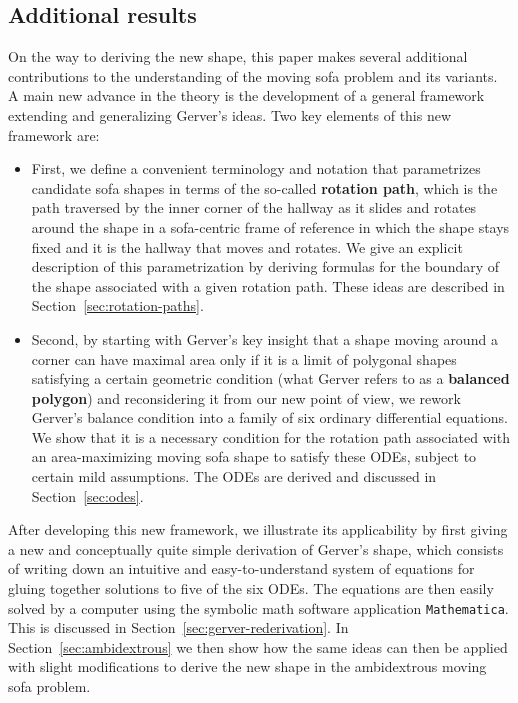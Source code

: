 \documentclass[11pt]{article}
\begin{document}
\subsection{Additional results}

On the way to deriving the new shape, this paper makes several additional contributions to the understanding of the moving sofa problem and its variants. A main new advance in the theory is the development of a general framework extending and generalizing Gerver's ideas. Two key elements of this new framework are: 

\begin{itemize}
\item First, we define a convenient terminology and notation that parametrizes candidate sofa shapes in terms of the so-called \textbf{rotation path}, which is the path traversed by the inner corner of the hallway as it slides and rotates around the shape in a sofa-centric frame of reference in which the shape stays fixed and it is the hallway that moves and rotates. We give an explicit description of this parametrization by deriving formulas for the boundary of the shape associated with a given rotation path. These ideas are described in Section~\ref{sec:rotation-paths}.

\item Second, by starting with Gerver's key insight that a shape moving around a corner can have maximal area only if it is a limit of polygonal shapes satisfying a certain geometric condition (what Gerver refers to as a \textbf{balanced polygon}) and reconsidering it from our new point of view, we rework Gerver's balance condition into a family of six ordinary differential equations. We show that it is a necessary condition for the rotation path associated with an area-maximizing moving sofa shape to satisfy these ODEs, subject to certain mild assumptions.
The ODEs are derived and discussed in Section~\ref{sec:odes}.
\end{itemize}

After developing this new framework, we illustrate its applicability by first giving a new and conceptually quite simple derivation of Gerver's shape, which consists of writing down an intuitive and easy-to-understand system of equations for gluing together solutions to five of the six ODEs. The equations are then easily solved by a computer using the symbolic math software application \texttt{Mathematica}. This is discussed in Section~\ref{sec:gerver-rederivation}. In Section~\ref{sec:ambidextrous} we then show how the same ideas can then be applied with slight modifications to derive the new shape in the ambidextrous moving sofa problem.
\end{document}
